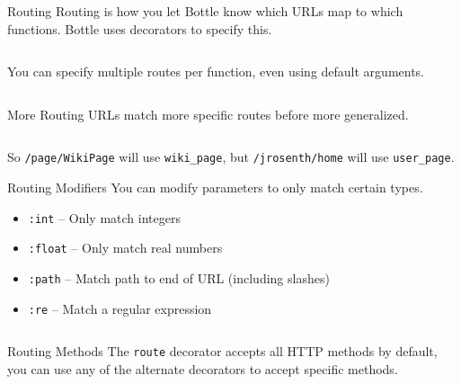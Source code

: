 \documentclass{lug}
\begin{document}
\begin{frame}{Routing}
    Routing is how you let Bottle know which URLs map to which functions.
    Bottle uses decorators to specify this.

    \inputminted{python3}{examples/route_simple.py}

    \pause
    \medskip

    You can specify multiple routes per function, even using default arguments.

    \inputminted{python3}{examples/multiroute.py}
\end{frame}

\begin{frame}{More Routing}
    URLs match more specific routes before more generalized.

    \inputminted{python3}{examples/generalized.py}

    \medskip

    So \texttt{/page/WikiPage} will use \texttt{wiki\_page}, but
    \texttt{/jrosenth/home} will use \texttt{user\_page}.
\end{frame}

\begin{frame}{Routing Modifiers}
    You can modify parameters to only match certain types.

    \begin{itemize}[<+->]
        \item \texttt{:int} -- Only match integers
        \item \texttt{:float} -- Only match real numbers
        \item \texttt{:path} -- Match path to end of URL (including slashes)
        \item \texttt{:re} -- Match a regular expression
    \end{itemize}

    \pause[\thebeamerpauses]
    \medskip

    \inputminted{python3}{examples/route_modifiers.py}

\end{frame}

\begin{frame}{Routing Methods}
    The \texttt{route} decorator accepts all HTTP methods by default, you can
    use any of the alternate decorators to accept specific methods.

    \medskip

    \inputminted{python3}{examples/route_methods.py}
\end{frame}
\end{document}

